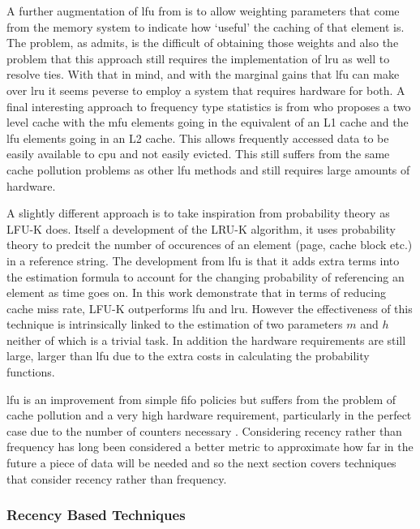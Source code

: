 A further augmentation of \gls{lfu} from \citet{kellyVariableQosShared1999} is to allow weighting parameters that come from the memory system to indicate how `useful' the caching of that element is. The problem, as \citeauthor{kellyVariableQosShared1999} admits, is the difficult of obtaining those weights and also the problem that this approach still requires the implementation of \gls{lru} as well to resolve ties. With that in mind, and with the marginal gains that \gls{lfu} can make over \gls{lru} it seems peverse to employ a system that requires hardware for both. A final interesting approach to frequency type statistics is from \citet{mekhielMultiLevelCacheMost29} who proposes a two level cache with the \gls{mfu} elements going in the equivalent of an L1 cache and the \gls{lfu} elements going in an L2 cache. This allows frequently accessed data to be easily available to \gls{cpu} and not easily evicted. This still suffers from the same cache pollution problems as other \gls{lfu} methods and still requires large amounts of hardware.

A slightly different approach is to take inspiration from probability theory as LFU-K \cite{sokolinskyLFUKEffectiveBuffer2004} does. Itself a development of the LRU-K algorithm, it uses probability theory to predcit the number of occurences of an element (page, cache block etc.) in a reference string. The development from \gls{lfu} is that it adds extra terms into the estimation formula to account for the changing probability of referencing an element as time goes on. In this work \citet{sokolinskyLFUKEffectiveBuffer2004} demonstrate that in terms of reducing cache miss rate, LFU-K outperforms \gls{lfu} and \gls{lru}. However the effectiveness of this technique is intrinsically linked to the estimation of two parameters $m$ and $h$ neither of which is a trivial task. In addition the hardware requirements are still large, larger than \gls{lfu} due to the extra costs in calculating the probability functions. 

\gls{lfu} is an improvement from simple \gls{fifo} policies but suffers from the problem of cache pollution and a very high hardware requirement, particularly in the perfect case due to the number of counters necessary \cite{podlipnigSurveyWebCache2003}. Considering recency rather than frequency has long been considered a better metric to approximate how far in the future a piece of data will be needed and so the next section covers techniques that consider recency rather than frequency. 

\subsubsection{Recency Based Techniques}

